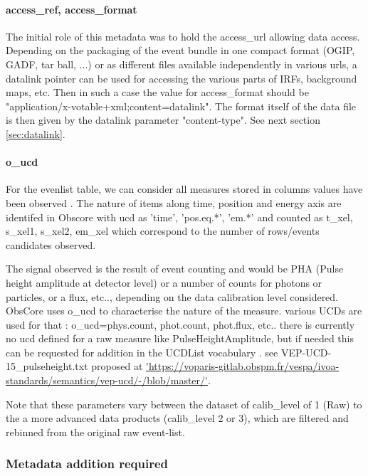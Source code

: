 \documentclass[11pt,a4paper]{ivoa}
\begin{document}
\paragraph{access\_ref, access\_format}
The initial role of this metadata was to hold the access\_url allowing data access.
Depending on the packaging of the event bundle in one compact format (OGIP, GADF, tar ball, ...)
or as different files available independently in various urls, a datalink pointer can be
used for accessing the various parts of IRFs, background maps, etc.
Then in such a case the value for access\_format should be "application/x-votable+xml;content=datalink".
The format itself of the data file is then given by the datalink parameter "content-type".
See next section \ref{sec:datalink}.

\paragraph{o\_ucd}
For the evenlist table, we can consider all measures stored in columns values have been observed .
The nature of items along time, position and energy axis are identifed in Obscore with ucd as 'time', 'pos.eq.*', 'em.*'
and counted as t\_xel, s\_xel1, s\_xel2, em\_xel which correspond to the number of rows/events candidates observed.

The signal observed is the result of event counting and would be PHA (Pulse height amplitude at detector level)
or a number of counts for photons or particles, or a flux, etc.., depending on the data calibration level considered.
ObsCore uses o\_ucd to characterise the nature of the measure.
various UCDs are used for that :
o\_ucd=phys.count, phot.count, phot.flux, etc..
there is currently no ucd defined for a raw measure like PulseHeightAmplitude,
but if needed this can be requested for addition in the UCDList vocabulary .
see VEP-UCD-15\_pulseheight.txt proposed at
\url{'https://voparis-gitlab.obspm.fr/vespa/ivoa-standards/semantics/vep-ucd/-/blob/master/'}.

Note that these parameters vary between the dataset of calib\_level of 1 (Raw) to the a more advanced data products (calib\_level 2 or 3), which are  filtered and rebinned from the original raw event-list.



\subsubsection{Metadata addition required}
\end{document}
